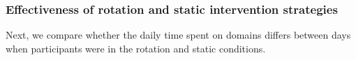 



\subsubsection{Effectiveness of rotation and static intervention strategies}


Next, we compare whether the daily time spent on domains differs between days when participants were in the rotation and static conditions.

